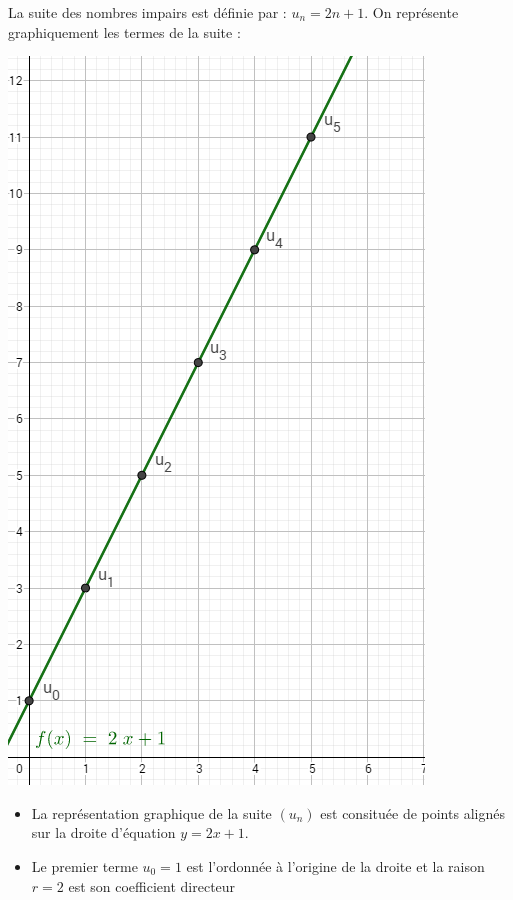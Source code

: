 \documentclass[12pt,a4paper]{article}
\begin{document}
\begin{myex}
	La suite des nombres impairs est définie par : $u_{n} = 2n +1$.
	On représente graphiquement les termes de la suite :
	
	\begin{multicols}{2}
		\includegraphics[scale=0.45]{img/arith}
		
		\begin{itemize}
			\item La représentation graphique de la suite $(u_n)$ est consituée de points alignés sur la droite d'équation $y=2x+1$.
			\item Le premier terme $u_0=1$ est l'ordonnée à l'origine de la droite et la raison $r=2$ est son coefficient directeur
		\end{itemize}
		
	\end{multicols}
	
\end{myex}
	
\end{document}
